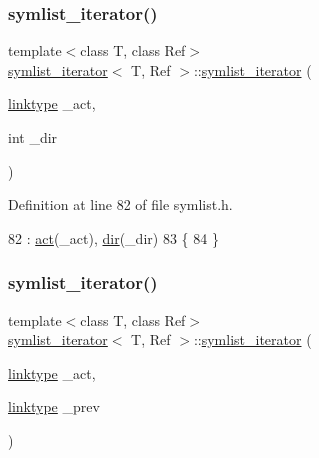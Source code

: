 \subsubsection{\texorpdfstring{symlist\+\_\+iterator()}{symlist\_iterator()}\hspace{0.1cm}{\footnotesize\ttfamily [3/4]}}
{\footnotesize\ttfamily template$<$class T, class Ref$>$ \\
\mbox{\hyperlink{structsymlist__iterator}{symlist\+\_\+iterator}}$<$ T, Ref $>$\+::\mbox{\hyperlink{structsymlist__iterator}{symlist\+\_\+iterator}} (\begin{DoxyParamCaption}\item[{\mbox{\hyperlink{structsymlist__iterator_ad9462ba519f8ca01ea64e04e25ee3750}{linktype}}}]{\+\_\+act,  }\item[{int}]{\+\_\+dir }\end{DoxyParamCaption})\hspace{0.3cm}{\ttfamily [inline]}}



Definition at line 82 of file symlist.\+h.


\begin{DoxyCode}
82                                               : \mbox{\hyperlink{structsymlist__iterator_a1c7a0193ab85baa7705070975d841fc8}{act}}(\_act), \mbox{\hyperlink{structsymlist__iterator_a8433e558ceb6b17b225414ef46b4a3e2}{dir}}(\_dir)
83     \{
84     \}
\end{DoxyCode}
\mbox{\label{structsymlist__iterator_a747f066c9c718ffc91688c5c4ed96f59}} 
\subsubsection{\texorpdfstring{symlist\+\_\+iterator()}{symlist\_iterator()}\hspace{0.1cm}{\footnotesize\ttfamily [4/4]}}
{\footnotesize\ttfamily template$<$class T, class Ref$>$ \\
\mbox{\hyperlink{structsymlist__iterator}{symlist\+\_\+iterator}}$<$ T, Ref $>$\+::\mbox{\hyperlink{structsymlist__iterator}{symlist\+\_\+iterator}} (\begin{DoxyParamCaption}\item[{\mbox{\hyperlink{structsymlist__iterator_ad9462ba519f8ca01ea64e04e25ee3750}{linktype}}}]{\+\_\+act,  }\item[{\mbox{\hyperlink{structsymlist__iterator_ad9462ba519f8ca01ea64e04e25ee3750}{linktype}}}]{\+\_\+prev }\end{DoxyParamCaption})\hspace{0.3cm}{\ttfamily [inline]}}



